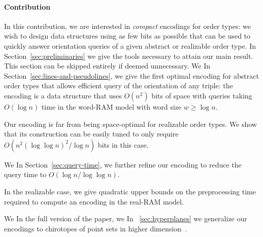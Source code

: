 


\paragraph{Contribution}

In this contribution, we are interested in \emph{compact} encodings for
order types: we wish to design data structures using as few bits as possible
that can be used to quickly answer orientation queries of a given abstract or
realizable order type.
\ifeurocg%
\DefinitionEncoding*
\fi%
%
\ifjournal%
	In Section~\ref{sec:preliminaries} we give the tools necessary to
	attain our main result. This section can be skipped entirely if deemed
	unnecessary.
\fi%
\ifeurocg%
We \else%
In Section~\ref{sec:lines-and-pseudolines}, we \fi%
give the first optimal encoding for abstract
order types that allows efficient query of the orientation of any triple: the
encoding is a data structure that uses \( O(n^2) \) bits of space with queries
taking \(O(\log n)\) time in the word-RAM model with word size \(w \geq \log
n\).
\ifeurocg%

\fi%
%
Our encoding is far from being space-optimal for realizable order types.
We show that its construction can be easily tuned to only require \(O(n^2
{(\log{\log{n}})}^2 / \log{n})\) bits in this case.
\ifeurocg%

\fi%
%
\ifeurocg%
We \else%
In Section~\ref{sec:query-time}, we \fi%
further refine our encoding to
reduce the query time to \(O(\log{n}/\log{\log{n}})\).
\ifeurocg%


\fi%
%
In the realizable case, we give quadratic upper bounds on the
preprocessing time required to compute an encoding in the real-RAM model.
\ifeurocg%

\fi%
%
\ifeurocg%
We \else\ifsocg%
In the full version of the paper, we \else%
In \appref~\ref{sec:hyperplanes} we \fi\fi%
generalize our encodings to chirotopes of
point sets in higher dimension\ifsocg~\cite{CCILO18}\fi.
\ifeurocg%

\fi%
\ifeurocg%

\fi%
